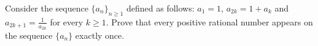 Consider the sequence $ \{a_n\}_{n\geq1}$ defined as follows: $ a_1 = 1$,  $ a_{2k} = 1 + a_k$ and $ a_{2k + 1} = \frac {1}{a_{2k}}$ for every $ k\geq 1$. Prove that every positive rational number appears on the sequence $ \{a_n\}$ exactly once.
